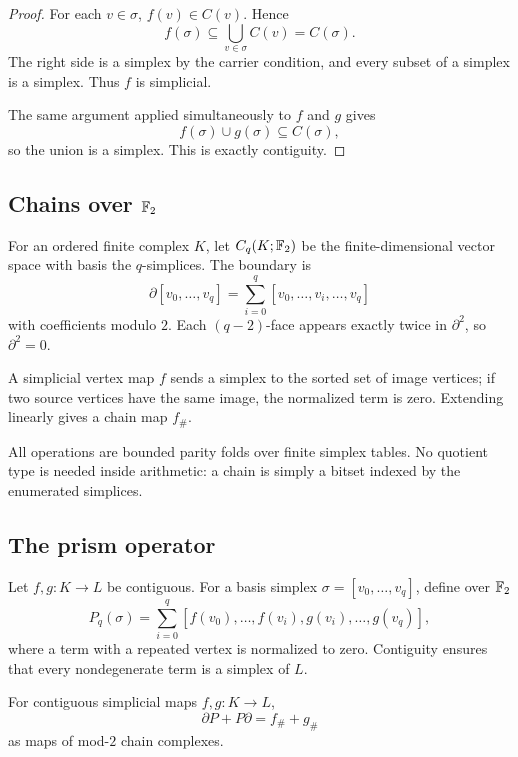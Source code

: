 \begin{proof}
For each $v\in\sigma$, $f(v)\in C(v)$.  Hence
\[
  f(\sigma)\subseteq \bigcup_{v\in\sigma}C(v)=C(\sigma).
\]
The right side is a simplex by the carrier condition, and every subset of a simplex is a simplex.  Thus $f$ is simplicial.

The same argument applied simultaneously to $f$ and $g$ gives
\[
  f(\sigma)\cup g(\sigma)\subseteq C(\sigma),
\]
so the union is a simplex.  This is exactly contiguity.
\end{proof}

\subsection{Chains over $\mathbb{F}_{2}$}

For an ordered finite complex $K$, let $C_q(K;\mathbb{F}_{2})$ be the finite-dimensional vector space with basis the $q$-simplices.  The boundary is
\[
  \partial[v_0,\ldots,v_q]
  =\sum_{i=0}^{q}[v_0,\ldots,\widehat{v_i},\ldots,v_q]
\]
with coefficients modulo $2$.  Each $(q-2)$-face appears exactly twice in $\partial^2$, so $\partial^2=0$.

A simplicial vertex map $f$ sends a simplex to the sorted set of image vertices; if two source vertices have the same image, the normalized term is zero.  Extending linearly gives a chain map $f_\#$.

All operations are bounded parity folds over finite simplex tables.  No quotient type is needed inside arithmetic: a chain is simply a bitset indexed by the enumerated simplices.

\subsection{The prism operator}

Let $f,g:K\to L$ be contiguous.  For a basis simplex $\sigma=[v_0,\ldots,v_q]$, define over $\mathbb{F}_{2}$
\[
  P_q(\sigma)=
  \sum_{i=0}^{q}
  [f(v_0),\ldots,f(v_i),g(v_i),\ldots,g(v_q)],
\]
where a term with a repeated vertex is normalized to zero.  Contiguity ensures that every nondegenerate term is a simplex of $L$.

\begin{theorem}
\label{thm:prism}
For contiguous simplicial maps $f,g:K\to L$,
\[
  \partial P+P\partial=f_\#+g_\#
\]
as maps of mod-$2$ chain complexes.
\end{theorem}

